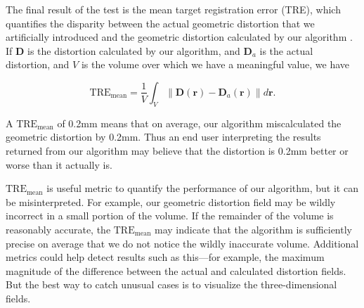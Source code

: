 \documentclass[12pt]{article}
\begin{document}
The final result of the test is the mean target registration error (TRE), which quantifies the disparity between the actual geometric distortion that we artificially introduced and the geometric distortion calculated by our algorithm \cite[page R37]{hill2001}.  If $\textbf{D}$ is the distortion calculated by our algorithm, and $\textbf{D}_a$ is the actual distortion, and $V$ is the volume over which we have a meaningful value, we have

$$
\textrm{TRE}_\textrm{mean} = \frac{1}{V}\int_V \| \textbf{D}(\textbf{r}) - \textbf{D}_a(\textbf{r}) \| d\textbf{r}.
$$

A $\textrm{TRE}_\textrm{mean}$ of 0.2mm means that on average, our algorithm miscalculated the geometric distortion by 0.2mm.  Thus an end user interpreting the results returned from our algorithm may believe that the distortion is 0.2mm better or worse than it actually is.

$\textrm{TRE}_\textrm{mean}$ is useful metric to quantify the performance of our algorithm, but it can be misinterpreted.  For example, our geometric distortion field may be wildly incorrect in a small portion of the volume.  If the remainder of the volume is reasonably accurate, the $\textrm{TRE}_\textrm{mean}$ may indicate that the algorithm is sufficiently precise on average that we do not notice the wildly inaccurate volume.  Additional metrics could help detect results such as this---for example, the maximum magnitude of the difference between the actual and calculated distortion fields.  But the best way to catch unusual cases is to visualize the three-dimensional fields.
\end{document}
